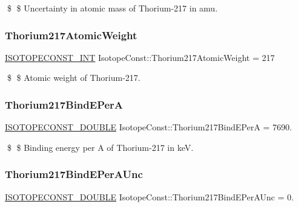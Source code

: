 \$ \$ Uncertainty in atomic mass of Thorium-\/217 in amu. \mbox{\label{group___isotope_const-_thorium-_th217_ga647c8135bf7145448c15f74e598e856e}} 
\subsubsection{\texorpdfstring{Thorium217\+Atomic\+Weight}{Thorium217AtomicWeight}}
{\footnotesize\ttfamily \mbox{\hyperlink{group___isotope_const-_macros_ga5f18360b3e99483a35c32d789e62621c}{I\+S\+O\+T\+O\+P\+E\+C\+O\+N\+S\+T\+\_\+\+I\+NT}} Isotope\+Const\+::\+Thorium217\+Atomic\+Weight = 217}

\$ \$ Atomic weight of Thorium-\/217. \mbox{\label{group___isotope_const-_thorium-_th217_gadec4ca29329641834fd85a4838c0f4e3}} 
\subsubsection{\texorpdfstring{Thorium217\+Bind\+E\+PerA}{Thorium217BindEPerA}}
{\footnotesize\ttfamily \mbox{\hyperlink{group___isotope_const-_macros_ga8f45a7272ce02c0b4c65c44636ed719a}{I\+S\+O\+T\+O\+P\+E\+C\+O\+N\+S\+T\+\_\+\+D\+O\+U\+B\+LE}} Isotope\+Const\+::\+Thorium217\+Bind\+E\+PerA = 7690.}

\$ \$ Binding energy per A of Thorium-\/217 in keV. \mbox{\label{group___isotope_const-_thorium-_th217_gaf3ee81ce81a9268010b041cb5c476a01}} 
\subsubsection{\texorpdfstring{Thorium217\+Bind\+E\+Per\+A\+Unc}{Thorium217BindEPerAUnc}}
{\footnotesize\ttfamily \mbox{\hyperlink{group___isotope_const-_macros_ga8f45a7272ce02c0b4c65c44636ed719a}{I\+S\+O\+T\+O\+P\+E\+C\+O\+N\+S\+T\+\_\+\+D\+O\+U\+B\+LE}} Isotope\+Const\+::\+Thorium217\+Bind\+E\+Per\+A\+Unc = 0.}

